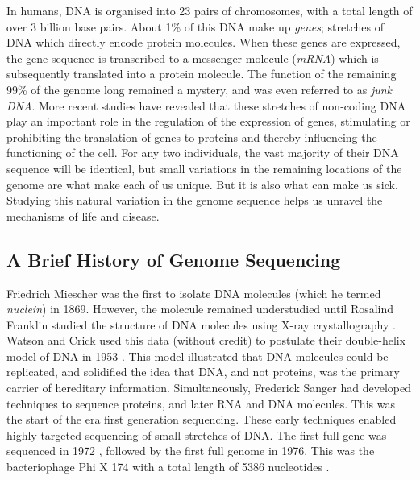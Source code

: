 In humans, DNA is organised into 23 pairs of chromosomes, with a total length of over 3 billion base pairs. About 1\% of this DNA make up \emph{genes}; stretches of DNA which directly encode protein molecules. When these genes are expressed, the gene sequence is transcribed to a messenger molecule (\emph{mRNA}) which is subsequently translated into a protein molecule. The function of the remaining 99\% of the genome long remained a mystery, and was even referred to as \emph{junk DNA}. More recent studies have revealed that these stretches of non-coding DNA play an important role in the regulation of the expression of genes, stimulating or prohibiting the translation of genes to proteins and thereby influencing the functioning of the cell. For any two individuals, the vast majority of their DNA sequence will be identical, but small variations in the remaining locations of the genome are what make each of us unique. But it is also what can make us sick. Studying this natural variation in the genome sequence helps us unravel the mechanisms of life and disease.


\subsection{A Brief History of Genome Sequencing}
Friedrich Miescher was the first to isolate DNA molecules (which he termed \emph{nuclein}) in 1869. However, the molecule remained understudied until Rosalind Franklin studied the structure of DNA molecules using X-ray crystallography \cite{TODO} . Watson and Crick used this data (without credit) to postulate their double-helix model of DNA in 1953 \cite{TODO}. This model illustrated that DNA molecules could be replicated, and solidified the idea that DNA, and not proteins, was the primary carrier of hereditary information. Simultaneously, Frederick Sanger had developed techniques to sequence proteins, and later RNA and DNA molecules. This was the start of the era first generation sequencing. These early techniques enabled highly targeted sequencing of small stretches of DNA. The first full gene was sequenced in 1972 \cite{TODO}, followed by the first full genome in 1976. This was the bacteriophage Phi X 174 with a total length of 5386 nucleotides \cite{}.


